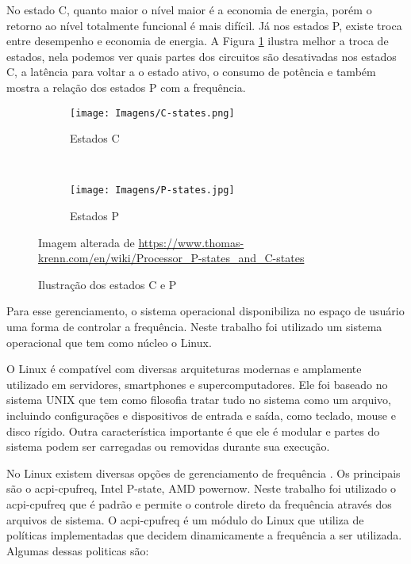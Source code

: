 No estado C, quanto maior o nível maior é a economia de energia, porém o retorno ao nível totalmente funcional é mais difícil. Já nos estados P, existe troca entre desempenho e economia de energia. A Figura \ref{fig:p_state} ilustra melhor a troca de estados, nela podemos ver quais partes dos circuitos são desativadas nos estados C, a latência para voltar a o estado ativo, o consumo de potência e também mostra a relação dos estados P com a frequência.

\begin{figure}[H]
	\centering
	\begin{subfigure}[t]{0.5\textwidth}
		\centering
		\texttt{[image: Imagens/C-states.png]}
		\caption{Estados C}
	\end{subfigure}%
	~ 
	\begin{subfigure}[t]{0.5\textwidth}
		\centering
		\texttt{[image: Imagens/P-states.jpg]}
		\caption{Estados P}
	\end{subfigure}	
	\caption{Ilustração dos estados C e P}{Imagem alterada de \protect\url{https://www.thomas-krenn.com/en/wiki/Processor_P-states_and_C-states}}
	\label{fig:p_state}
\end{figure}



Para esse gerenciamento, o sistema operacional disponibiliza no espaço de usuário uma forma de controlar a frequência. Neste trabalho foi utilizado um sistema operacional que tem como núcleo o Linux.

O Linux é compatível com diversas arquiteturas modernas e amplamente utilizado em servidores, smartphones e supercomputadores. Ele foi baseado no sistema UNIX que tem como filosofia tratar tudo no sistema como um arquivo, incluindo configurações e dispositivos de entrada e saída, como teclado, mouse e disco rígido. Outra característica importante é que ele é modular e partes do sistema podem ser carregadas ou removidas durante sua execução.

No Linux existem diversas opções de gerenciamento de frequência \cite{Brown2005}. Os principais são o acpi-cpufreq, Intel P-state, AMD powernow. Neste trabalho foi utilizado o acpi-cpufreq que é padrão e permite o controle direto da frequência através dos arquivos de sistema. O acpi-cpufreq é um módulo do Linux que utiliza de políticas implementadas que decidem dinamicamente a frequência a ser utilizada. Algumas dessas politicas são:

